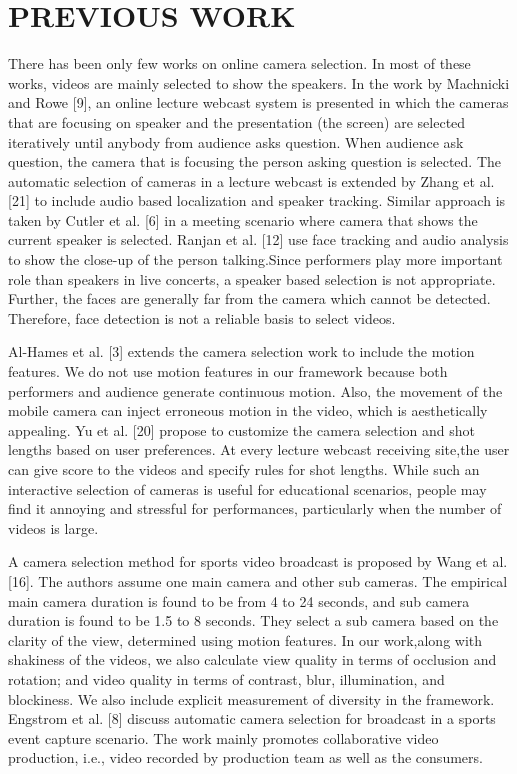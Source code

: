 \documentclass{sig-alternate}
\begin{document}
\section{PREVIOUS WORK}
There has been only few works on online camera selection. In most of these works, videos are mainly selected to show the speakers. In the work by Machnicki and Rowe [9], an online lecture webcast system is presented in which the cameras that are focusing on speaker and the presentation (the screen) are selected iteratively until anybody from audience asks question. When audience ask question, the camera that is focusing the person asking question is selected. The automatic selection of cameras in a lecture webcast is extended by Zhang et al. [21] to include audio based localization and speaker tracking. Similar approach is taken by Cutler et al. [6] in a meeting scenario where camera that shows the current speaker is selected. Ranjan et al. [12] use face tracking and audio analysis to show the close-up of the person talking.Since performers play more important role than speakers in live concerts, a speaker based selection is not appropriate. Further, the faces are generally far from the camera which cannot be detected. Therefore, face detection is not a reliable basis to select videos.

Al-Hames et al. [3] extends the camera selection work to include the motion features. We do not use motion features in our framework because both performers and audience generate continuous motion. Also, the movement of the mobile camera can inject erroneous motion in the video, which is aesthetically appealing. Yu et al. [20] propose to customize the camera selection and shot lengths based on user preferences. At every lecture webcast receiving site,the user can give score to the videos and specify rules for shot lengths. While such an interactive selection of cameras is useful for educational scenarios, people may find it annoying and stressful for performances, particularly when the number of videos is large.

A camera selection method for sports video broadcast is proposed by Wang et al. [16]. The authors assume one main camera and other sub cameras. The empirical main camera duration is found to be from 4 to 24 seconds, and sub camera duration is found to be 1.5 to 8 seconds. They select a sub camera based on the clarity of the view, determined using motion features. In our work,along with shakiness of the videos, we also calculate view quality in terms of occlusion and rotation; and video quality in terms of contrast, blur, illumination, and blockiness. We also include explicit measurement of diversity in the framework. Engstrom et al. [8] discuss automatic camera selection for broadcast in a sports event capture scenario. The work mainly promotes collaborative video production, i.e., video recorded by production team as well as the consumers.
\end{document}
